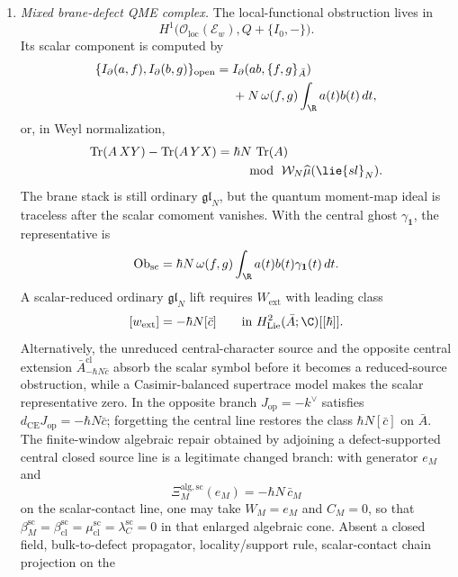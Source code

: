 \begin{enumerate}
  \item \emph{Mixed brane-defect QME complex.}
  The local-functional obstruction lives in
  \[
    H^1\bigl(\mathcal O_{\mathrm{loc}}(\mathcal E_w),
      Q+\{I_0,-\}\bigr).
  \]
  Its scalar component is computed by
  \[
    \begin{aligned}
    \{I_\partial(a,f),I_\partial(b,g)\}_{\mathrm{open}}
    ={}&
    I_\partial(ab,\{f,g\}_{\bar A})\\
    &+N\,\omega(f,g)\int_\R a(t)b(t)\,dt ,
    \end{aligned}
  \]
  or, in Weyl normalization,
  \[
    \begin{aligned}
    \operatorname{Tr}(A\,XY)-\operatorname{Tr}(A\,YX)
      ={}&\hbar N\,\operatorname{Tr}(A)\\
      &\quad\bmod\ \mathcal W_N\widehat\mu(\lie{sl}_N).
    \end{aligned}
  \]
	  The brane stack is still ordinary \(\mathfrak{gl}_N\), but the quantum
	  moment-map ideal is traceless after the scalar comoment vanishes.
  With the central ghost \(\gamma_{\mathbf 1}\), the representative is
  \[
    \operatorname{Ob}_{\mathrm{sc}}
    =
    \hbar N\,\omega(f,g)
    \int_\R a(t)b(t)\gamma_{\mathbf 1}(t)\,dt .
  \]
	  A scalar-reduced ordinary \(\mathfrak{gl}_N\) lift requires
	  \(W_{\mathrm{ext}}\) with leading class
	  \[
	    [w_{\mathrm{ext}}]=-\hbar N[\bar c]
	    \qquad\text{in }H^2_{\mathrm{Lie}}(\bar A;\C)[[\hbar]].
	  \]
	  Alternatively, the unreduced central-character source and the opposite
	  central extension
	  \(\bar A^{\mathrm{cl}}_{-\hbar N\bar c}\) absorb the scalar symbol
	  before it becomes a reduced-source obstruction, while a
	  Casimir-balanced supertrace model makes the scalar representative
	  zero.  In the opposite branch
	  \(J_{\mathrm{op}}=-k^\vee\) satisfies
	  \(d_{\mathrm{CE}}J_{\mathrm{op}}=-\hbar N\bar c\); forgetting the
	  central line restores the class \(\hbar N[\bar c]\) on \(\bar A\).
	  The finite-window algebraic repair obtained by adjoining a
	  defect-supported central closed source line is a legitimate changed
	  branch: with generator \(e_M\) and
	  \[
	    \Xi^{\mathrm{alg},\mathrm{sc}}_M(e_M)
	    =
	    -\hbar N\,\bar c_M
	  \]
	  on the scalar-contact line, one may take \(W_M=e_M\) and \(C_M=0\),
	  so that
	  \(\beta^{\mathrm{sc}}_M=\beta^{\mathrm{sc}}_{\mathrm{cl}}
	  =\mu^{\mathrm{sc}}_{\mathrm{cl}}
	  =\lambda^{\mathrm{sc}}_C=0\) in that enlarged algebraic cone.
	  Absent a closed field, bulk-to-defect propagator,
	  locality/support rule, scalar-contact chain projection on the

\end{enumerate}
